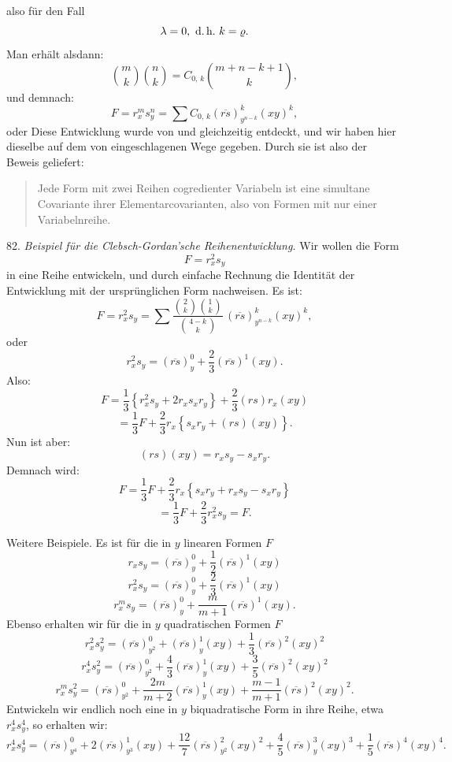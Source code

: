 also für den Fall
\[
\lambda=0,\ \text{d.\,h.}\ k=\varrho.
\]
Man erhält alsdann:
\[
\binom{m}{k}\binom{n}{k}=C_{0,\,k}\binom{m+n-k+1}{k},
\]
und demnach:
\[
F=r_x^m s_y^n=\sum C_{0,\,k}(\overline{rs})^k_{y^{n-k}}(xy)^k,
\]
oder
Diese Entwicklung wurde von  und  gleichzeitig entdeckt, und wir haben hier dieselbe auf dem von  eingeschlagenen Wege gegeben. Durch sie ist also der Beweis geliefert:

\begin{quote}
\glqq Jede Form mit zwei Reihen cogredienter Variabeln ist eine simultane Covariante ihrer Elementarcovarianten, also von Formen mit nur einer Variabelnreihe.\grqq{}
\end{quote}

82. \textit{Beispiel für die Clebsch-Gordan'sche Reihenentwicklung.} Wir wollen die Form
\[
F=r_x^2 s_y
\]
in eine Reihe entwickeln, und durch einfache Rechnung die Identität der Entwicklung mit der ursprünglichen Form nachweisen. Es ist:
\[
F=r_x^2 s_y=\sum \frac{\binom{2}{k}\binom{1}{k}}{\binom{4-k}{k}}\,(\overline{rs})^k_{y^{n-k}}(xy)^k,
\]
oder
\[
r_x^2 s_y=(\overline{rs})^0_y+\frac{2}{3}(\overline{rs})^1(xy).
\]
Also:
\[
F=\frac{1}{3}\left\{r_x^2 s_y+2r_x s_x r_y\right\}+\frac{2}{3}(rs)r_x(xy)
\]
\[
=\frac{1}{3}F+\frac{2}{3}r_x\left\{s_x r_y+(rs)(xy)\right\}.
\]
Nun ist aber:
\[
(rs)(xy)=r_x s_y - s_x r_y.
\]
Demnach wird:
\[
F=\frac{1}{3}F+\frac{2}{3}r_x\left\{s_x r_y+r_x s_y-s_x r_y\right\}
\]
\[
=\frac{1}{3}F+\frac{2}{3}r_x^2 s_y=F.
\]


Weitere Beispiele. Es ist für die in $y$ linearen Formen $F$
\[
r_x s_y=(\overline{rs})^0_y+\frac{1}{2}(\overline{rs})^1(xy)
\]
\[
r_x^2 s_y=(\overline{rs})^0_y+\frac{2}{3}(\overline{rs})^1(xy)
\]
\[
r_x^m s_y=(\overline{rs})^0_y+\frac{m}{m+1}(\overline{rs})^1(xy).
\]
Ebenso erhalten wir für die in $y$ quadratischen Formen $F$
\[
r_x^2 s_y^2=(\overline{rs})^0_{y^2}+(\overline{rs})^1_y(xy)+\frac{1}{3}(\overline{rs})^2(xy)^2
\]
\[
r_x^4 s_y^2=(\overline{rs})^0_{y^2}+\frac{4}{3}(\overline{rs})^1_y(xy)+\frac{3}{5}(\overline{rs})^2(xy)^2
\]
\[
r_x^m s_y^2=(\overline{rs})^0_{y^2}+\frac{2m}{m+2}(\overline{rs})^1_y(xy)+\frac{m-1}{m+1}(\overline{rs})^2(xy)^2.
\]
Entwickeln wir endlich noch eine in $y$ biquadratische Form in ihre Reihe, etwa $r_x^4 s_y^4$, so erhalten wir:
\[
r_x^4 s_y^4=(\overline{rs})^0_{y^4}+2(\overline{rs})^1_{y^3}(xy)+\frac{12}{7}(\overline{rs})^2_{y^2}(xy)^2+\frac{4}{5}(\overline{rs})^3_y(xy)^3+\frac{1}{5}(\overline{rs})^4(xy)^4.
\]

